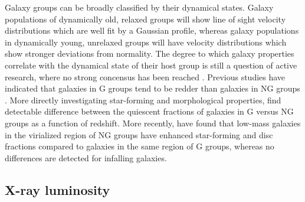 Galaxy groups can be broadly classified by their dynamical states.
Galaxy populations of dynamically old, relaxed groups will show
line of sight velocity distributions which are well fit by a Gaussian
profile, whereas galaxy populations in dynamically young, unrelaxed
groups will have velocity distributions which show stronger deviations
from normality.  The degree to which galaxy properties correlate with
the dynamical state of their host group is still a question of active
research, where no strong concensus has been reached
\citep[e.g.][]{biviano2002, ribeiro2013b}.  Previous studies have
indicated that galaxies in G groups tend to be redder than galaxies in
NG groups \citep{ribeiro2010, carollo2013, ribeiro2013a}.  More
directly investigating star-forming and morphological properties,
\citet{hou2013} find detectable difference between the quiescent
fractions of galaxies in G versus NG groups as a function of
redshift.  More recently, \citet{roberts2016b} have found that
low-mass galaxies in the virialized region of NG groups have enhanced
star-forming and disc fractions compared to galaxies in the same
region of G groups, whereas no differences are detected for infalling
galaxies.

\subsection{X-ray luminosity}
\label{sec:xray_lum}

